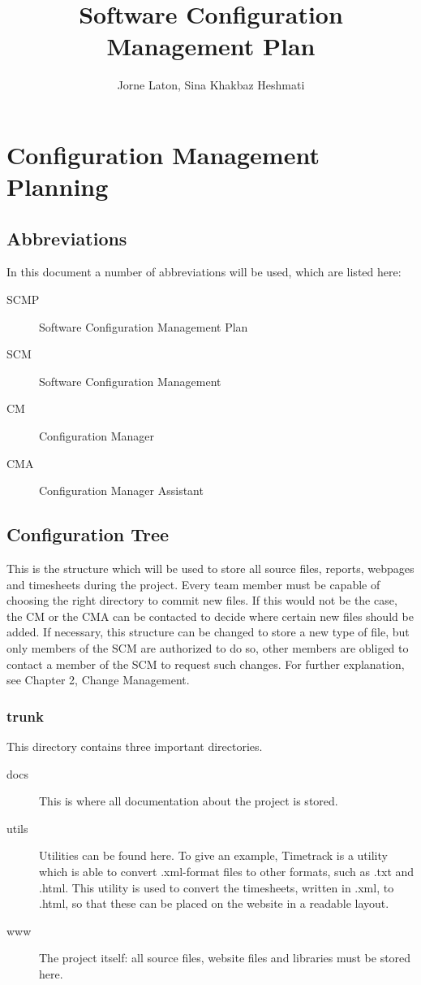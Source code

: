 \documentclass{report}
\author{Jorne Laton, Sina Khakbaz Heshmati}
\title{Software Configuration Management Plan}
\begin{document}
\maketitle
\tableofcontents

\chapter{Configuration Management Planning}
\section{Abbreviations}
In this document a number of abbreviations will be used, which are listed here:
\begin{description}
\item[SCMP]
Software Configuration Management Plan
\item[SCM]
Software Configuration Management
\item[CM]
Configuration Manager
\item[CMA]
Configuration Manager Assistant
\end{description}
\section{Configuration Tree}
This is the structure which will be used to store all source files, reports, webpages and timesheets during the project.
Every team member must be capable of choosing the right directory to commit new files.
If this would not be the case, the CM or the CMA can be contacted to decide where certain new files should be added.
If necessary, this structure can be changed to store a new type of file, but only members of the SCM are authorized to do so, other members are obliged to contact a member of the SCM to request such changes.
For further explanation, see Chapter 2, Change Management.
\subsection{trunk}
This directory contains three important directories.
\begin{description}
\item[docs]
This is where all documentation about the project is stored.
\item[utils]
Utilities can be found here.
To give an example, Timetrack is a utility which is able to convert .xml-format files to other formats, such as .txt and .html.
This utility is used to convert the timesheets, written in .xml, to .html, so that these can be placed on the website in a readable layout.
\item[www]
The project itself: all source files, website files and libraries must be stored here.
\end{description}
\end{document}
